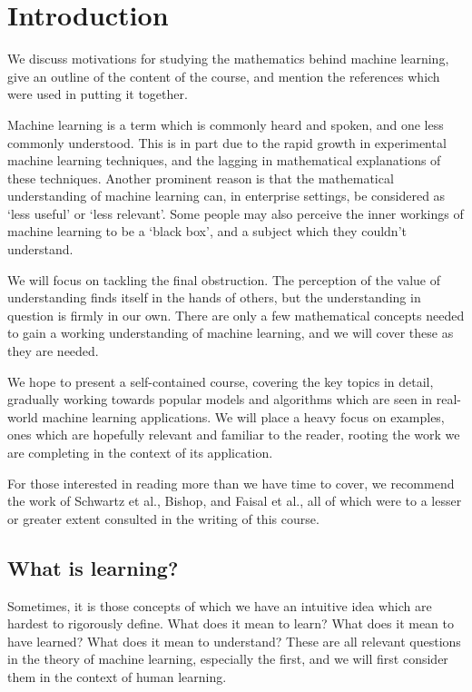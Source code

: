 \chapter{Introduction}

\begin{chout}
	We discuss motivations for studying the mathematics behind machine learning, give an outline of the content of the course, and mention the references which were used in putting it together.
\end{chout}

Machine learning is a term which is commonly heard and spoken, and one less commonly understood. This is in part due to the rapid growth in experimental machine learning techniques, and the lagging in mathematical explanations of these techniques. Another prominent reason is that the mathematical understanding of machine learning can, in enterprise settings, be considered as `less useful' or `less relevant'. Some people may also perceive the inner workings of machine learning to be a `black box', and a subject which they couldn't understand.

We will focus on tackling the final obstruction. The perception of the value of understanding finds itself in the hands of others, but the understanding in question is firmly in our own. There are only a few mathematical concepts needed to gain a working understanding of machine learning, and we will cover these as they are needed.

We hope to present a self-contained course, covering the key topics in detail, gradually working towards popular models and algorithms which are seen in real-world machine learning applications. We will place a heavy focus on examples, ones which are hopefully relevant and familiar to the reader, rooting the work we are completing in the context of its application.

For those interested in reading more than we have time to cover, we recommend the work of Schwartz et al.\cite{schwartz}, Bishop\cite{bishop}, and Faisal et al.\cite{faisal}, all of which were to a lesser or greater extent consulted in the writing of this course.

\section{What is learning?}
Sometimes, it is those concepts of which we have an intuitive idea which are hardest to rigorously define. What does it mean to learn? What does it mean to have learned? What does it mean to understand? These are all relevant questions in the theory of machine learning, especially the first, and we will first consider them in the context of human learning.

